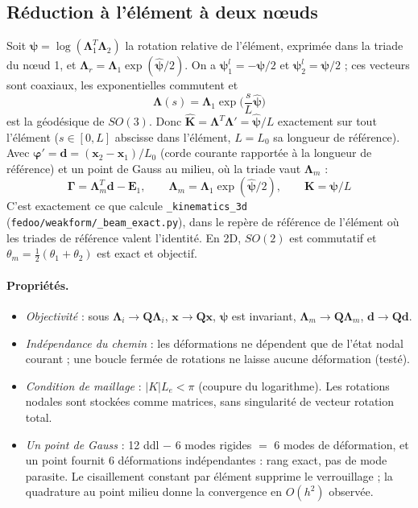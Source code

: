 \documentclass[11pt,a4paper]{article}
\newcommand{\hatv}[1]{\widehat{\bm{#1}}}
\newcommand{\Lam}{\bm{\Lambda}}
\newcommand{\Gam}{\bm{\Gamma}}
\newcommand{\Kv}{\mathbf{K}}
\newcommand{\code}[1]{\texttt{#1}}
\begin{document}
\subsection{Réduction à l'élément à deux nœuds}
Soit $\bm\psi=\log(\Lam_1^T\Lam_2)$ la rotation relative de l'élément, exprimée
dans la triade du nœud 1, et $\Lam_r=\Lam_1\exp(\hatv\psi/2)$. On a
$\bm\psi^l_1=-\bm\psi/2$ et $\bm\psi^l_2=\bm\psi/2$ ; ces vecteurs sont coaxiaux,
les exponentielles commutent et
\begin{equation}
\Lam(s)=\Lam_1\exp\!\Big(\frac sL\hatv\psi\Big)
\end{equation}
est la géodésique de $SO(3)$. Donc $\hatv K=\Lam^T\Lam'=\hatv\psi/L$ exactement
sur tout l'élément ($s\in[0,L]$ abscisse dans l'élément, $L=L_0$ sa longueur de
référence). Avec $\bm\varphi'=\mathbf d=(\mathbf x_2-\mathbf x_1)/L_0$ (corde
courante rapportée à la longueur de référence) et un point de Gauss au milieu,
où la triade vaut $\Lam_m$ :
\begin{equation}
\boxed{\;\Gam=\Lam_m^T\mathbf d-\mathbf E_1,\qquad \Lam_m=\Lam_1\exp(\hatv\psi/2),\qquad \Kv=\bm\psi/L\;}
\end{equation}
C'est exactement ce que calcule \code{\_kinematics\_3d}
(\code{fedoo/weakform/\_beam\_exact.py}), dans le repère de référence de
l'élément où les triades de référence valent l'identité. En 2D, $SO(2)$ est
commutatif et $\theta_m=\tfrac12(\theta_1+\theta_2)$ est exact et objectif.

\paragraph{Propriétés.}
\begin{itemize}
\item \emph{Objectivité} : sous $\Lam_i\to\mathbf Q\Lam_i$, $\mathbf x\to\mathbf Q\mathbf x$,
$\bm\psi$ est invariant, $\Lam_m\to\mathbf Q\Lam_m$, $\mathbf d\to\mathbf Q\mathbf d$.
\item \emph{Indépendance du chemin} : les déformations ne dépendent que de
l'état nodal courant ; une boucle fermée de rotations ne laisse aucune
déformation (testé).
\item \emph{Condition de maillage} : $|K|L_e<\pi$ (coupure du logarithme).
Les rotations nodales sont stockées comme matrices, sans singularité de vecteur
rotation total.
\item \emph{Un point de Gauss} : 12 ddl $-$ 6 modes rigides $=$ 6 modes de
déformation, et un point fournit 6 déformations indépendantes : rang exact,
pas de mode parasite. Le cisaillement constant par élément supprime le
verrouillage ; la quadrature au point milieu donne la convergence en $O(h^2)$
observée.
\end{itemize}
\end{document}
